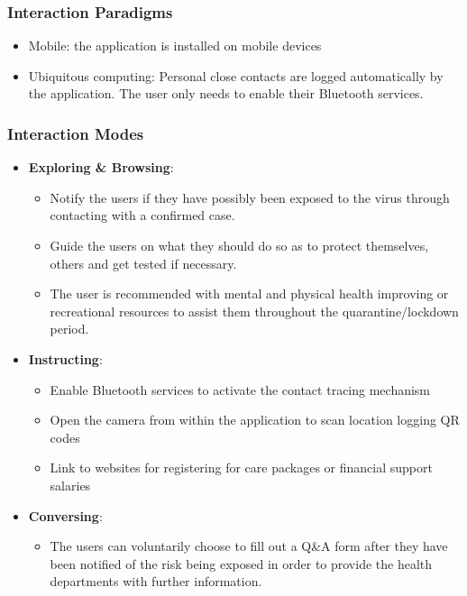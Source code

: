     \subsubsection{Interaction Paradigms}
      \begin{itemize}
        \item Mobile: the application is installed on mobile devices
        \item Ubiquitous computing: Personal close contacts are logged automatically by the application. The user only needs to enable their Bluetooth services.
      \end{itemize}

    \subsubsection{Interaction Modes}
      \begin{itemize}
        \item \textbf{Exploring \& Browsing}:
          \begin{itemize}
            \item Notify the users if they have possibly been exposed to the virus through contacting with a confirmed case.
            \item Guide the users on what they should do so as to protect themselves, others and get tested if necessary.
            \item The user is recommended with mental and physical health improving or recreational resources to assist them throughout the quarantine/lockdown period.
          \end{itemize}
        \item \textbf{Instructing}:
          \begin{itemize}
            \item Enable Bluetooth services to activate the contact tracing mechanism
            \item Open the camera from within the application to scan location logging QR codes
            \item Link to websites for registering for care packages or financial support salaries
          \end{itemize}
        \item \textbf{Conversing}:
          \begin{itemize}
            \item The users can voluntarily choose to fill out a Q\&A form after they have been notified of the risk being exposed in order to provide the health departments with further information.
          \end{itemize}
      \end{itemize}
    
